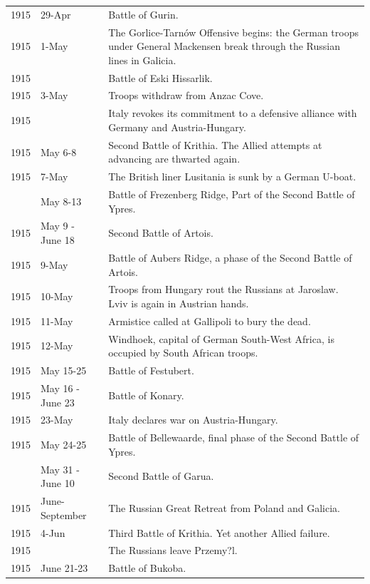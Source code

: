\documentclass[
  openany]{book}
\begin{document}
\begin{longtable}[t]{rl>{\raggedright\arraybackslash}p{22em}}
\rowcolor{gray!6}  1915 & 29-Apr & Battle of Gurin.\\
1915 & 1-May & The Gorlice-Tarnów Offensive begins: the German troops under General Mackensen break through the Russian lines in Galicia.\\
\addlinespace
\rowcolor{gray!6}  1915 &  & Battle of Eski Hissarlik.\\
1915 & 3-May & Troops withdraw from Anzac Cove.\\
\rowcolor{gray!6}  1915 &  & Italy revokes its commitment to a defensive alliance with Germany and Austria-Hungary.\\
1915 & May 6-8 & Second Battle of Krithia. The Allied attempts at advancing are thwarted again.\\
\rowcolor{gray!6}  1915 & 7-May & The British liner Lusitania is sunk by a German U-boat.\\
\addlinespace
1915 & May 8-13 & Battle of Frezenberg Ridge, Part of the Second Battle of Ypres.\\
\rowcolor{gray!6}  1915 & May 9 - June 18 & Second Battle of Artois.\\
1915 & 9-May & Battle of Aubers Ridge, a phase of the Second Battle of Artois.\\
\rowcolor{gray!6}  1915 & 10-May & Troops from Hungary rout the Russians at Jaroslaw. Lviv is again in Austrian hands.\\
1915 & 11-May & Armistice called at Gallipoli to bury the dead.\\
\addlinespace
\rowcolor{gray!6}  1915 & 12-May & Windhoek, capital of German South-West Africa, is occupied by South African troops.\\
1915 & May 15-25 & Battle of Festubert.\\
\rowcolor{gray!6}  1915 & May 16 - June 23 & Battle of Konary.\\
1915 & 23-May & Italy declares war on Austria-Hungary.\\
\rowcolor{gray!6}  1915 & May 24-25 & Battle of Bellewaarde, final phase of the Second Battle of Ypres.\\
\addlinespace
1915 & May 31 - June 10 & Second Battle of Garua.\\
\rowcolor{gray!6}  1915 & June-September & The Russian Great Retreat from Poland and Galicia.\\
1915 & 4-Jun & Third Battle of Krithia. Yet another Allied failure.\\
\rowcolor{gray!6}  1915 &  & The Russians leave Przemy?l.\\
1915 & June 21-23 & Battle of Bukoba.\\

\end{longtable}
\end{document}
